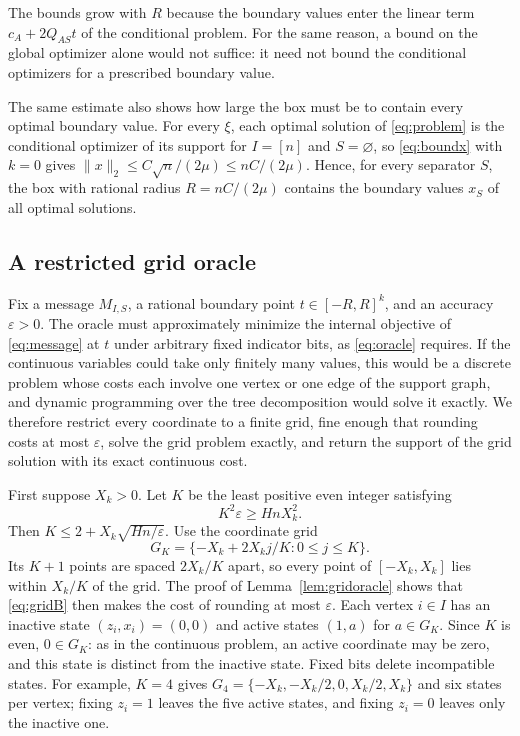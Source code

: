 The bounds grow with $R$ because the boundary values enter the linear
term $c_A+2Q_{AS}t$ of the conditional problem. For the same reason, a
bound on the global optimizer alone would not suffice: it need not bound
the conditional optimizers for a prescribed boundary value.

The same estimate also shows how large the box must be to contain every
optimal boundary value. For every $\xi$, each optimal
solution of \eqref{eq:problem} is the conditional optimizer of its
support for $I=[n]$ and $S=\varnothing$, so \eqref{eq:boundx} with $k=0$
gives $\|x\|_2\le C\sqrt n/(2\mu)\le nC/(2\mu)$. Hence, for every
separator $S$, the box with rational radius $R=nC/(2\mu)$ contains the
boundary values $x_S$ of all optimal solutions.

\subsection{A restricted grid oracle}\label{sec:spectral-oracle}
Fix a message $M_{I,S}$, a rational boundary point $t\in[-R,R]^k$, and
an accuracy $\varepsilon>0$. The oracle must approximately minimize the
internal objective of \eqref{eq:message} at $t$ under arbitrary fixed
indicator bits, as \eqref{eq:oracle} requires. If the continuous
variables could take only finitely many values, this would be a discrete
problem whose costs each involve one vertex or one edge of the support
graph, and dynamic programming over the tree decomposition would solve
it exactly. We therefore restrict every coordinate to a finite grid,
fine enough that rounding costs at most $\varepsilon$, solve the grid
problem exactly, and return the support of the grid solution with its
exact continuous cost.

First suppose $X_k>0$. Let $K$ be the least positive even integer
satisfying
\begin{equation}\label{eq:gridB}
 K^2\varepsilon\ge HnX_k^2.
\end{equation}
Then $K\le2+X_k\sqrt{Hn/\varepsilon}$. Use the coordinate grid
\[
 G_K=\{-X_k+2X_kj/K:0\le j\le K\}.
\]
Its $K+1$ points are spaced $2X_k/K$ apart, so every point of
$[-X_k,X_k]$ lies within $X_k/K$ of the grid. The proof of
Lemma~\ref{lem:gridoracle} shows that \eqref{eq:gridB} then makes the
cost of rounding at most $\varepsilon$. Each vertex $i\in I$ has an
inactive state $(z_i,x_i)=(0,0)$ and active states $(1,a)$ for
$a\in G_K$. Since $K$ is even, $0\in G_K$: as in the continuous problem,
an active coordinate may be zero, and this state is distinct from the
inactive state. Fixed bits delete incompatible states. For example,
$K=4$ gives $G_4=\{-X_k,-X_k/2,0,X_k/2,X_k\}$ and six states per vertex;
fixing $z_i=1$ leaves the five active states, and fixing $z_i=0$ leaves
only the inactive one.

